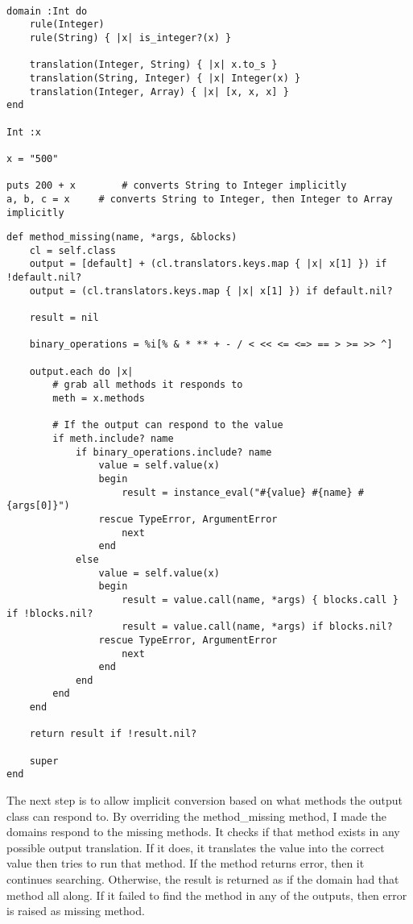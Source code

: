 \begin{lstlisting}[caption={Implicit conversion demo}]

domain :Int do
    rule(Integer)
    rule(String) { |x| is_integer?(x) }

    translation(Integer, String) { |x| x.to_s }
    translation(String, Integer) { |x| Integer(x) }
    translation(Integer, Array) { |x| [x, x, x] }
end

Int :x

x = "500"

puts 200 + x		# converts String to Integer implicitly
a, b, c = x		# converts String to Integer, then Integer to Array implicitly
\end{lstlisting}

\begin{lstlisting}[caption={Implicit conversion: method\_missing}]
def method_missing(name, *args, &blocks)
    cl = self.class
    output = [default] + (cl.translators.keys.map { |x| x[1] }) if !default.nil?
    output = (cl.translators.keys.map { |x| x[1] }) if default.nil?

    result = nil

    binary_operations = %i[% & * ** + - / < << <= <=> == > >= >> ^]

    output.each do |x|
        # grab all methods it responds to
        meth = x.methods

        # If the output can respond to the value
        if meth.include? name
            if binary_operations.include? name
                value = self.value(x)                    
                begin
                    result = instance_eval("#{value} #{name} #{args[0]}")
                rescue TypeError, ArgumentError
                    next
                end
            else
                value = self.value(x)
                begin
                    result = value.call(name, *args) { blocks.call } if !blocks.nil?
                    result = value.call(name, *args) if blocks.nil?
                rescue TypeError, ArgumentError
                    next
                end
            end
        end
    end

    return result if !result.nil?

    super
end
\end{lstlisting}

The next step is to allow implicit conversion based on what methods the output class can respond to.  By overriding the method\_missing method, I made the domains respond to the missing methods.  It checks if that method exists in any possible output translation.  If it does, it translates the value into the correct value then tries to run that method.  If the method returns error, then it continues searching.  Otherwise, the result is returned as if the domain had that method all along.  If it failed to find the method in any of the outputs, then error is raised as missing method.

